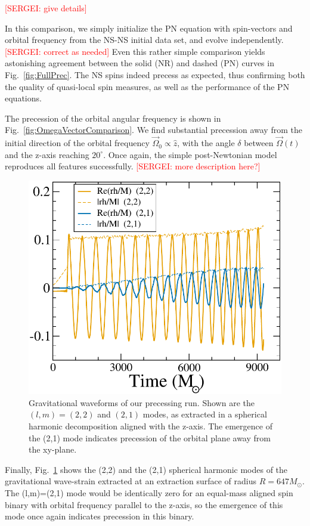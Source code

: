 \documentclass[aps,prd,amsmath,floatfix
,twocolumn
,superscriptaddress,nofootinbib,showpacs]{revtex4-1}
\theoremstyle{plain} \newtheorem{thm}{Theorem} \newtheorem{lem}{Lemma}
\newcommand{\red}[1]{\textcolor{Red}{#1}}
\begin{document}
\red{[SERGEI:  give details]}

In this comparison, we simply initialize the PN equation with
spin-vectors and orbital frequency from the NS-NS initial data set,
and evolve independently.  \red{[SERGEI: correct as needed]} Even this
rather simple comparison yields astonishing agreement between the
solid (NR) and dashed (PN) curves in Fig.~\ref{fig:FullPrec}.  The NS
spins indeed precess as expected, thus confirming both the quality of
quasi-local spin measures, as well as the performance of the PN
equations.

The precession of the orbital angular frequency is shown in
Fig.~\ref{fig:OmegaVectorComparison}.  We find substantial precession
away from the initial direction of the orbital frequency
$\vec\Omega_0\propto \hat z$, with the angle $\delta$ between
$\vec\Omega(t)$ and the z-axis reaching $20^\circ$.  Once again, the
simple post-Newtonian model reproduces all features successfully.  
\red{[SERGEI:  more description here?]}

\begin{figure}
\includegraphics[width=0.9\columnwidth]{PrecGW}
\caption{\label{fig:PrecGW} Gravitational waveforms of our precessing
  run.  Shown are the $(l,m)=(2,2)$ and $(2,1)$ modes, as extracted in
  a spherical harmonic decomposition aligned with the z-axis.  The
  emergence of the (2,1) mode indicates precession of the orbital
  plane away from the xy-plane.}
\end{figure}


Finally, Fig.~\ref{fig:PrecGW} shows the (2,2) and the (2,1) spherical
harmonic modes of the gravitational wave-strain extracted at an
extraction surface of radius $R=647M_\odot$.  The
(l,m)=(2,1) mode would be identically zero for an equal-mass aligned
spin binary with orbital frequency parallel to the z-axis, so the
emergence of this mode once again indicates precession in this binary.
\end{document}
